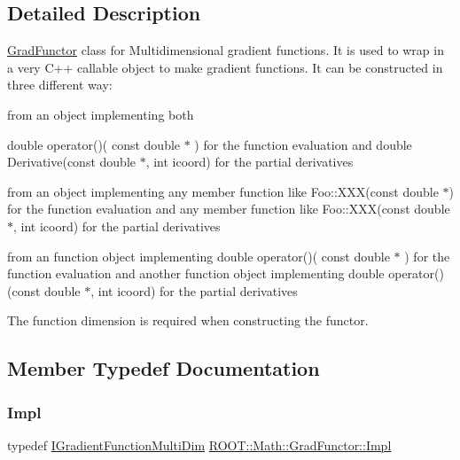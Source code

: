 \subsection{Detailed Description}
\mbox{\hyperlink{classROOT_1_1Math_1_1GradFunctor}{Grad\+Functor}} class for Multidimensional gradient functions. It is used to wrap in a very C++ callable object to make gradient functions. It can be constructed in three different way\+: 
\begin{DoxyEnumerate}
\item from an object implementing both

double operator()( const double $\ast$ ) for the function evaluation and double Derivative(const double $\ast$, int icoord) for the partial derivatives 
\item from an object implementing any member function like Foo\+::\+X\+X\+X(const double $\ast$) for the function evaluation and any member function like Foo\+::\+X\+X\+X(const double $\ast$, int icoord) for the partial derivatives 
\item from an function object implementing double operator()( const double $\ast$ ) for the function evaluation and another function object implementing double operator() (const double $\ast$, int icoord) for the partial derivatives 
\end{DoxyEnumerate}The function dimension is required when constructing the functor. 

\subsection{Member Typedef Documentation}
\mbox{\label{classROOT_1_1Math_1_1GradFunctor_a4ce94e1b525d38a2d7da3c88ace6e0f9}} 
\subsubsection{\texorpdfstring{Impl}{Impl}\hspace{0.1cm}{\footnotesize\ttfamily [1/2]}}
{\footnotesize\ttfamily typedef \mbox{\hyperlink{classROOT_1_1Math_1_1IGradientFunctionMultiDim}{I\+Gradient\+Function\+Multi\+Dim}} \mbox{\hyperlink{classROOT_1_1Math_1_1GradFunctor_a4ce94e1b525d38a2d7da3c88ace6e0f9}{R\+O\+O\+T\+::\+Math\+::\+Grad\+Functor\+::\+Impl}}}

\mbox{\label{classROOT_1_1Math_1_1GradFunctor_a4ce94e1b525d38a2d7da3c88ace6e0f9}} 

